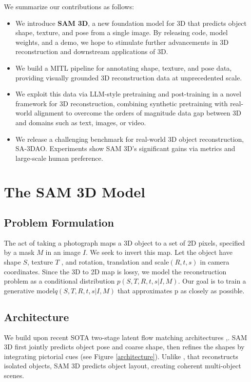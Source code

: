 \documentclass[manuscript,review]{acmart}
\begin{document}
\newpage
We summarize our contributions as follows:
\begin{itemize}
    \item We introduce \textbf{SAM 3D}, a new foundation model for 3D that predicts object shape, texture, and pose from a single image. By releasing code, model weights, and a demo, we hope to stimulate further advancements in 3D reconstruction and downstream applications of 3D.
    
    \item We build a MITL pipeline for annotating shape, texture, and pose data, providing visually grounded 3D reconstruction data at unprecedented scale.

    \item We exploit this data via LLM-style pretraining and post-training in a novel framework for 3D reconstruction, combining synthetic pretraining with real-world alignment to overcome the orders of magnitude data gap between 3D and domains such as text, images, or video.

    \item We release a challenging benchmark for real-world 3D object reconstruction, SA-3DAO. Experiments show SAM 3D’s significant gains via metrics and large-scale human preference.
\end{itemize}

\section{The SAM 3D Model}
\subsection{Problem Formulation}

The act of taking a photograph maps a 3D object to a set of 2D pixels, specified by a mask $M$ in an image $I$. We seek to invert this map. Let the object have shape $S$, texture $T$ , and rotation, translation and scale$(R, t, s)$ in camera coordinates. Since the 3D to 2D map is lossy, we model the reconstruction problem as a conditional distribution $p(S, T, R, t, s|I, M ) $. Our goal is to train a generative model$ q(S, T, R, t, s|I, M ) $ that approximates p as closely as possible.

\subsection{Architecture}

We build upon recent SOTA two-stage latent flow matching architectures
\citet{xiang2025structured},\citeyear{xiang2025structured}. SAM 3D first jointly predicts object pose and coarse shape, then refines the shapes by integrating pictorial cues
(see Figure \ref{architecture}). Unlike \citet{xiang2025structured},\citeyear{xiang2025structured} that reconstructs isolated objects, SAM 3D predicts object layout, creating coherent multi-object scenes.
\end{document}
